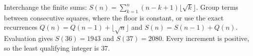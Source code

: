 Interchange the finite sums: $S(n)=\sum_{k=1}^n(n-k+1)\lfloor\sqrt{k}\rfloor$. Group terms between consecutive squares, where the floor is constant, or use the exact recurrences $Q(n)=Q(n-1)+\lfloor\sqrt n\rfloor$ and $S(n)=S(n-1)+Q(n)$. Evaluation gives $S(36)=1943$ and $S(37)=2080$. Every increment is positive, so the least qualifying integer is $\boxed{37}$.
